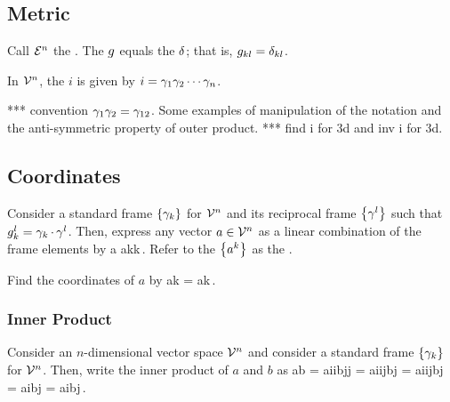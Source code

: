 \subsection{Metric}
Call $\mathcal{E}^{n}$ the . The  $g$ equals the  $\delta$; that is, $g_{{k}{l}} = \delta_{{k}{l}}$.

In $\mathcal{V}^{n}$, the  $i$ is given by $i = \gamma_{1}\gamma_{2}\dotsb\gamma_{n}$.

*** convention $\gamma_{1}\gamma_{2} = \gamma_{12}$. Some examples of manipulation of the notation and the anti-symmetric property of outer product.
*** find i for 3d and inv i for 3d.


\subsection{Coordinates}
Consider a standard frame $\left\lbrace{\gamma_{k}}\right\rbrace$ for $\mathcal{V}^{n}$ and its reciprocal frame $\left\lbrace{\gamma^{l}}\right\rbrace$ such that $g^{l}_{k} = \gamma_{k}\operatorname{\cdot}\gamma^{l}$. Then, express any vector $a\in\mathcal{V}^{n}$ as a linear combination of the frame elements by
\beq
a  \comp ak\ifvec k\,.
\eeq
Refer to the $\left\lbrace{{a}^{k}}\right\rbrace$ as the .

Find the coordinates of $a$ by
\beq
\comp ak = a\iprod\ifvec k\,.
\eeq

%
%


\subsubsection{Inner Product}
Consider an $n$-dimensional vector space $\mathcal{V}^{n}$ and consider a standard frame $\left\lbrace{\gamma_{k}}\right\rbrace$ for $\mathcal{V}^{n}$. Then, write the inner product of $a$ and $b$ as
\beq
a\iprod b = \comp ai\ifvec i\iprod \comp bj\ifvec j
          = \comp ai\ifvec i\iprod \ifvec j\comp bj
          = \comp ai\imet ij\comp bj
          = \comp ai\rcomp bj
          = \rcomp ai\comp bj\,.
\eeq


